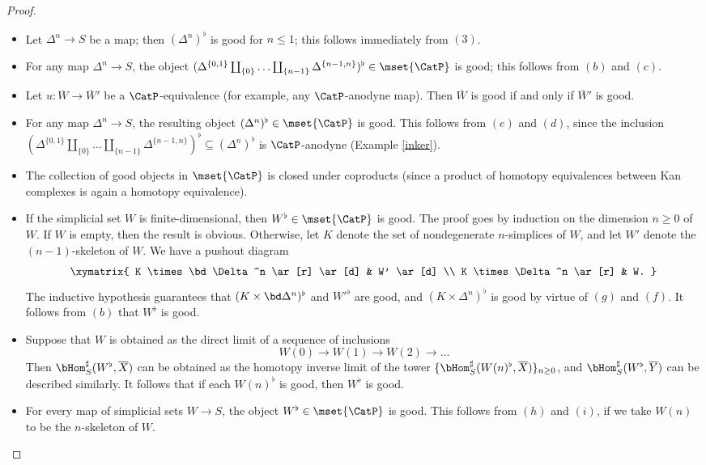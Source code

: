 \begin{proof}
\begin{itemize}
\item[$(c)$] Let $\Delta^n \rightarrow S$ be a map; then $( \Delta^n)^{\flat}$ is good for $n \leq 1$; this follows immediately from $(3)$.

\item[$(d)$] For any map $\Delta^n \rightarrow S$, the object
$( \Delta^{ \{0,1\} } \coprod_{ \{0\} } \ldots \coprod_{ \{n-1\} } \Delta^{ \{n-1,n\} })^{\flat} \in \mset{ \CatP}$
is good; this follows from $(b)$ and $(c)$.

\item[$(e)$] Let $u: \overline{W} \rightarrow \overline{W}'$ be a $\CatP$-equivalence (for
example, any $\CatP$-anodyne map). Then $\overline{W}$ is good if and only if $\overline{W}'$ is good.

\item[$(f)$] For any map $\Delta^n \rightarrow S$, the resulting object
$( \Delta^n)^{\flat} \in \mset{ \CatP}$ is good. This follows from $(e)$ and $(d)$, since the
inclusion 
$( \Delta^{ \{0,1\} } \coprod_{ \{0\} } \ldots \coprod_{ \{n-1\} } \Delta^{ \{n-1,n\} })^{\flat} \subseteq (\Delta^n)^{\flat}$ is $\CatP$-anodyne (Example \ref{inker}).

\item[$(g)$] The collection of good objects in $\mset{\CatP}$ is closed under coproducts
(since a product of homotopy equivalences between Kan complexes is again a homotopy equivalence).

\item[$(h)$] If the simplicial set $W$ is finite-dimensional, then $W^{\flat} \in \mset{ \CatP}$ is good.
The proof goes by induction on the dimension $n \geq 0$ of $W$. If $W$ is empty, then the result is obvious. Otherwise, let $K$ denote the set of nondegenerate $n$-simplices of $W$, and let
$W'$ denote the $(n-1)$-skeleton of $W$. We have a pushout diagram
$$ \xymatrix{ K \times \bd \Delta^n \ar[r] \ar[d] & W' \ar[d] \\
K \times \Delta^n \ar[r] & W. }$$
The inductive hypothesis guarantees that $(K \times \bd \Delta^n)^{\flat}$ and ${W'}^{\flat}$ are good, and $(K \times \Delta^n)^{\flat}$ is good by virtue of $(g)$ and $(f)$. It follows from
$(b)$ that $W^{\flat}$ is good.

\item[$(i)$] Suppose that $W$ is obtained as the direct limit of a sequence of inclusions
$$ W(0) \rightarrow W(1) \rightarrow W(2) \rightarrow \ldots $$
Then $\bHom_{S}^{\sharp}( W^{\flat}, \overline{X} )$ can be obtained as the homotopy inverse limit of the tower $\{ \bHom_{S}^{\sharp}( W(n)^{\flat}, \overline{X} ) \}_{n \geq 0}$, and $
\bHom_{S}^{\sharp}( W^{\flat}, \overline{Y} )$ can be described similarly. It follows that
if each $W(n)^{\flat}$ is good, then $W^{\flat}$ is good.

\item[$(j)$] For every map of simplicial sets $W \rightarrow S$, the object
$W^{\flat} \in \mset{ \CatP}$ is good. This follows from $(h)$ and $(i)$,
if we take $W(n)$ to be the $n$-skeleton of $W$.
\end{itemize}
\end{proof}

